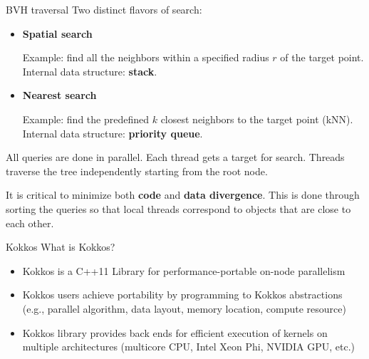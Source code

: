 \documentclass[final,hyperref={pdfpagelabels=false}]{beamer}
\begin{document}
\begin{frame}[t,fragile]
\begin{columns}[t]
\begin{column}{.480\textwidth}
\begin{block}{\centering BVH traversal}
  Two distinct flavors of search:

  \begin{itemize}
    \item \textbf{Spatial search}

      Example: find all the neighbors within a specified radius $r$ of the target point.
      Internal data structure: \textbf{stack}.

    \item \textbf{Nearest search}

      Example: find the predefined $k$ closest neighbors to the target point
      (kNN).
      Internal data structure: \textbf{priority queue}.

  \end{itemize}

  All queries are done in parallel. Each thread gets a target for search.
  Threads traverse the tree independently starting from the root
  node.

  It is critical to minimize both \textbf{code} and \textbf{data divergence}.
  This is done through sorting the queries so that local threads correspond to
  objects that are close to each other.

\end{block}

\begin{block}{\centering Kokkos}
  What is Kokkos?
  \begin{itemize}
    \item Kokkos is a C++11 Library for performance-portable on-node parallelism
    \item Kokkos users achieve portability by programming to Kokkos
      abstractions (e.g., parallel algorithm, data layout, memory location,
      compute resource)
    \item Kokkos library provides back ends for efficient execution of kernels
      on multiple architectures (multicore CPU, Intel Xeon Phi, NVIDIA GPU, etc.)
  \end{itemize}
\end{block}


\end{column}
\end{columns}
\end{frame}
\end{document}
